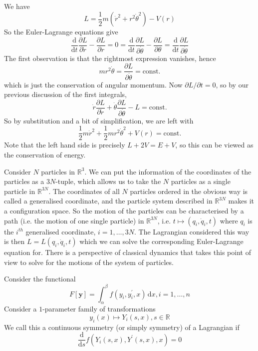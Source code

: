 \documentclass{article}
\begin{document}
\begin{example}
    We have
    $$L=\frac{1}{2}m(\dot{r}^2+r^2\dot{\theta}^2)-V(r)$$
    So the Euler-Lagrange equations give
    $$\frac{\mathrm d}{\mathrm dt}\frac{\partial L}{\partial \dot{r}}-\frac{\partial L}{\partial r}=0=\frac{\mathrm d}{\mathrm dt}\frac{\partial L}{\partial \dot{\theta}}-\frac{\partial L}{\partial \theta}=\frac{\mathrm d}{\mathrm dt}\frac{\partial L}{\partial \dot{\theta}}$$
    The first observation is that the rightmost expression vanishes, hence
    $$mr^2\dot{\theta}=\frac{\partial L}{\partial\dot{\theta}}=\text{const.}$$
    which is just the conservation of angular momentum.
    Now $\partial L/\partial t=0$, so by our previous discussion of the first integrals,
    $$\dot{r}\frac{\partial L}{\partial \dot{r}}+\dot{\theta}\frac{\partial L}{\partial\dot{\theta}}-L=\text{const.}$$
    So by substitution and a bit of simplification, we are left with
    $$\frac{1}{2}m\dot{r}^2+\frac{1}{2}mr^2\dot{\theta}^2+V(r)=\text{const.}$$
    Note that the left hand side is precisely $L+2V=E+V$, so this can be viewed as the conservation of energy.
\end{example}
\begin{example}
    Consider $N$ particles in $\mathbb R^3$.
    We can put the information of the coordinates of the particles as a $3N$-tuple, which allows us to take the $N$ particles as a single particle in $\mathbb R^{3N}$.
    The coordinates of all $N$ particles ordered in the obvious way is called a generalised coordinate, and the particle system described in $\mathbb R^{3N}$ makes it a configuration space.
    So the motion of the particles can be characterised by a path (i.e. the motion of one single particle) in $\mathbb R^{3N}$, i.e. $t\mapsto (q_i,\dot{q}_i,t)$ where $q_i$ is the $i^{th}$ generalised coordinate, $i=1,\ldots,3N$.
    The Lagrangian considered this way is then $L=L(q_i,\dot{q}_i,t)$ which we can solve the corresponding Euler-Lagrange equation for.
    There is a perspective of classical dynamics that takes this point of view to solve for the motions of the system of particles.
\end{example}
Consider the functional
$$F[\mathbf{y}]=\int_\alpha^\beta f(y_i,y_i^\prime,x)\,\mathrm dx,i=1,\ldots,n$$
Consider a $1$-parameter family of transformations
$$y_i(x)\mapsto Y_i(s,x),s\in\mathbb R$$
We call this a continuous symmetry (or simply symmetry) of a Lagrangian if
$$\frac{\mathrm d}{\mathrm ds}f(Y_i(s,x),Y^\prime(s,x),x)=0$$
\end{document}

